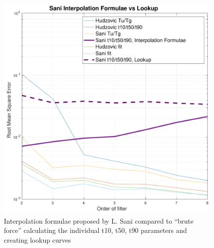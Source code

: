 \begin{figure}
    \includegraphics[width=\linewidth]{images/sani_interpolation_vs_lookup}
    \caption{Interpolation formulae proposed by L. Sani compared to ``brute force'' calculating the individual t10, t50, t90 parameters and creating lookup curves}
    \label{fig:interpolation_vs_lookup}
\end{figure}


